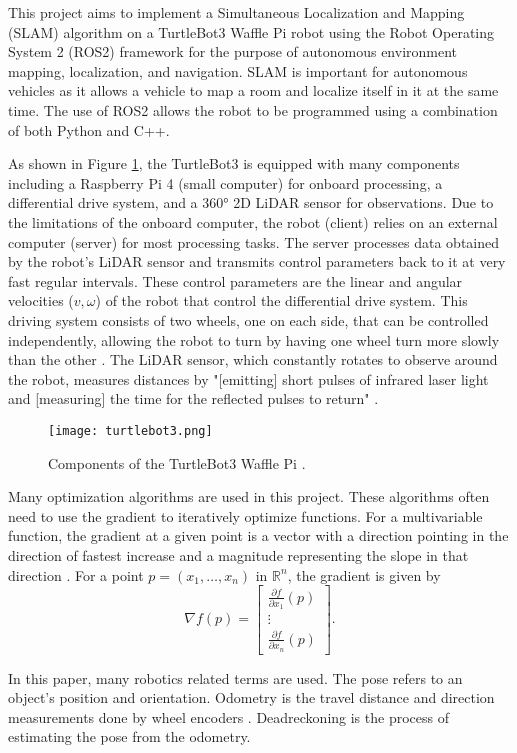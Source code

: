 This project aims to implement a Simultaneous Localization and Mapping (SLAM) algorithm on a TurtleBot3 Waffle Pi robot using the Robot Operating System 2 (ROS2) framework for the purpose of autonomous environment mapping, localization, and navigation. SLAM is important for autonomous vehicles as it allows a vehicle to map a room and localize itself in it at the same time. The use of ROS2 allows the robot to be programmed using a combination of both Python and C++.

As shown in Figure \ref{fig:turtlebot3}, the TurtleBot3 is equipped with many components including a Raspberry Pi 4 (small computer) for onboard processing, a differential drive system, and a 360° 2D LiDAR sensor for observations. Due to the limitations of the onboard computer, the robot (client) relies on an external computer (server) for most processing tasks. The server processes data obtained by the robot's LiDAR sensor and transmits control parameters back to it at very fast regular intervals. These control parameters are the linear and angular velocities ($v,\omega$) of the robot that control the differential drive system. This driving system consists of two wheels, one on each side, that can be controlled independently, allowing the robot to turn by having one wheel turn more slowly than the other \parencite{corkeRoboticsVisionControl2023}. The LiDAR sensor, which constantly rotates to observe around the robot, measures distances by "[emitting] short pulses of infrared laser light and [measuring] the time for the reflected pulses to return" \parencite{corkeRoboticsVisionControl2023}.

\begin{figure}[htb]
    \texttt{[image: turtlebot3.png]}
    \centering
    \caption{Components of the TurtleBot3 Waffle Pi \parencite{ROBOTISEManual}.}
    \label{fig:turtlebot3}
\end{figure}

Many optimization algorithms are used in this project. These algorithms often need to use the gradient to iteratively optimize functions. For a multivariable function, the gradient at a given point is a vector with a direction pointing in the direction of fastest increase and a magnitude representing the slope in that direction \parencite{Gradient2024}.
For a point $p = (x_1,\hdots, x_n)$ in $\mathbb{R}^n$, the gradient is given by
\[
    \nabla f(p)=\begin{bmatrix}
        \frac{\partial f}{\partial x_1}(p) \\[6pt]
        \vdots                             \\[6pt]
        \frac{\partial f}{\partial x_n}(p)
    \end{bmatrix}.
\]

In this paper, many robotics related terms are used. The pose refers to an object's position and orientation. Odometry is the travel distance and direction measurements done by wheel encoders \parencite{corkeRoboticsVisionControl2023}. Deadreckoning is the process of estimating the pose from the odometry. 